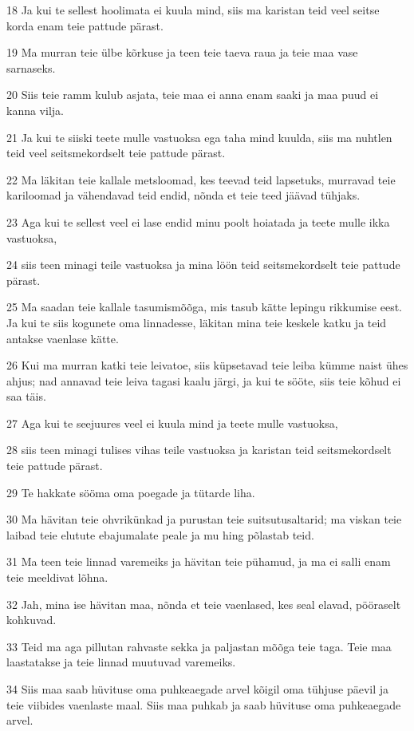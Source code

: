 \par 18 Ja kui te sellest hoolimata ei kuula mind, siis ma karistan teid veel seitse korda enam teie pattude pärast.
\par 19 Ma murran teie ülbe kõrkuse ja teen teie taeva raua ja teie maa vase sarnaseks.
\par 20 Siis teie ramm kulub asjata, teie maa ei anna enam saaki ja maa puud ei kanna vilja.
\par 21 Ja kui te siiski teete mulle vastuoksa ega taha mind kuulda, siis ma nuhtlen teid veel seitsmekordselt teie pattude pärast.
\par 22 Ma läkitan teie kallale metsloomad, kes teevad teid lapsetuks, murravad teie kariloomad ja vähendavad teid endid, nõnda et teie teed jäävad tühjaks.
\par 23 Aga kui te sellest veel ei lase endid minu poolt hoiatada ja teete mulle ikka vastuoksa,
\par 24 siis teen minagi teile vastuoksa ja mina löön teid seitsmekordselt teie pattude pärast.
\par 25 Ma saadan teie kallale tasumismõõga, mis tasub kätte lepingu rikkumise eest. Ja kui te siis kogunete oma linnadesse, läkitan mina teie keskele katku ja teid antakse vaenlase kätte.
\par 26 Kui ma murran katki teie leivatoe, siis küpsetavad teie leiba kümme naist ühes ahjus; nad annavad teie leiva tagasi kaalu järgi, ja kui te sööte, siis teie kõhud ei saa täis.
\par 27 Aga kui te seejuures veel ei kuula mind ja teete mulle vastuoksa,
\par 28 siis teen minagi tulises vihas teile vastuoksa ja karistan teid seitsmekordselt teie pattude pärast.
\par 29 Te hakkate sööma oma poegade ja tütarde liha.
\par 30 Ma hävitan teie ohvrikünkad ja purustan teie suitsutusaltarid; ma viskan teie laibad teie elutute ebajumalate peale ja mu hing põlastab teid.
\par 31 Ma teen teie linnad varemeiks ja hävitan teie pühamud, ja ma ei salli enam teie meeldivat lõhna.
\par 32 Jah, mina ise hävitan maa, nõnda et teie vaenlased, kes seal elavad, pööraselt kohkuvad.
\par 33 Teid ma aga pillutan rahvaste sekka ja paljastan mõõga teie taga. Teie maa laastatakse ja teie linnad muutuvad varemeiks.
\par 34 Siis maa saab hüvituse oma puhkeaegade arvel kõigil oma tühjuse päevil ja teie viibides vaenlaste maal. Siis maa puhkab ja saab hüvituse oma puhkeaegade arvel.

